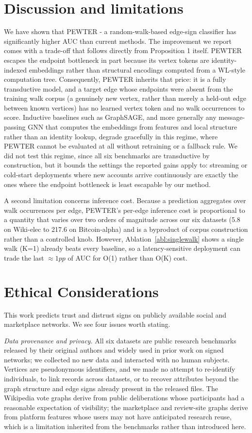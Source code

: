 \documentclass[sigconf, review, anonymous]{acmart}
\theoremstyle{plain}
\theoremstyle{definition}
\begin{document}
\section{Discussion and limitations}
We have shown that PEWTER - a random-walk-based edge-sign classifier has significantly higher AUC than current methods.  The improvement we report comes with a trade-off that follows directly from Proposition 1 itself. PEWTER escapes the endpoint bottleneck in part because its vertex tokens are identity-indexed embeddings rather than structural encodings computed from a WL-style computation tree. Consequently, PEWTER inherits that price: it is a fully transductive model, and a target edge whose endpoints were absent from the training walk corpus (a genuinely new vertex, rather than merely a held-out edge between known vertices) has no learned vertex token and no walk occurrences to score. Inductive baselines such as GraphSAGE, and more generally any message-passing GNN that computes the embeddings from features and local structure rather than an identity lookup, degrade gracefully in this regime, where PEWTER cannot be evaluated at all without retraining or a fallback rule. We did not test this regime, since all six benchmarks are transductive by construction, but it bounds the settings the reported gains apply to: streaming or cold-start deployments where new accounts arrive continuously are exactly the ones where the endpoint bottleneck is least escapable by our method.

A second limitation concerns inference cost. Because a prediction aggregates over 
walk occurrences per edge, PEWTER's per-edge inference cost is proportional to a quantity that varies over two orders of magnitude across our six datasets (5.8 on Wiki-elec to 217.6 on Bitcoin-alpha) and is a byproduct of corpus construction rather than a controlled knob. However, Ablation~\ref{abl:singlewalk} shows a single walk (K=1) already beats every baseline, so a latency-sensitive deployment can trade the last $\approx1pp$ of AUC for O(1) rather than O(K) cost.
\section*{Ethical Considerations}
This work predicts trust and distrust signs on publicly available social and marketplace networks. We see four issues worth stating.

\emph{Data provenance and privacy.} All six datasets are public research benchmarks released by their original authors and widely used in prior work on signed networks; we collected no new data and interacted with no human subjects. Vertices are pseudonymous identifiers, and we made no attempt to re-identify individuals, to link records across datasets, or to recover attributes beyond the graph structure and edge signs already present in the released files. The Wikipedia vote graphs derive from public deliberations whose participants had a reasonable expectation of visibility; the marketplace and review-site graphs derive from platform features whose users may not have anticipated research reuse, which is a limitation inherited from the benchmarks rather than introduced here.
\end{document}
